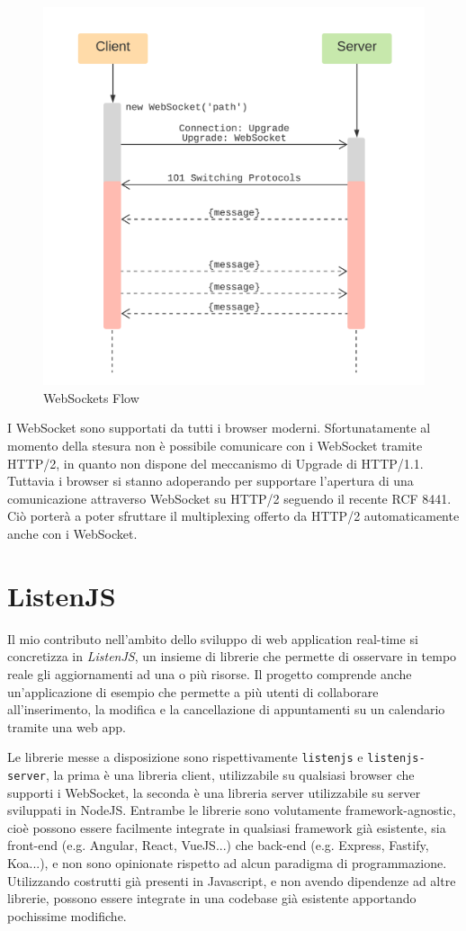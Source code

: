 \documentclass[12pt,a4paper,openright,twoside]{report}
\begin{document}
\begin{figure}[!htbp]
\centering
\includegraphics[width=.5\textwidth]{assets/websockets.png}
\caption{WebSockets Flow}
\label{fig:websockets}
\end{figure}
I WebSocket sono supportati da tutti i browser moderni. 
Sfortunatamente al momento della stesura non è possibile comunicare con i WebSocket tramite HTTP/2, in quanto non dispone del meccanismo di Upgrade di HTTP/1.1. Tuttavia i browser si stanno adoperando per supportare l'apertura di una comunicazione attraverso WebSocket su HTTP/2 seguendo il recente RCF 8441\cite{websockets_http2_rfc}. Ciò porterà a poter sfruttare il multiplexing offerto da HTTP/2 automaticamente anche con i WebSocket.
\chapter{ListenJS}
Il mio contributo nell'ambito dello sviluppo di web application real-time si concretizza in \textit{ListenJS}, un insieme di librerie che permette di osservare in tempo reale gli aggiornamenti ad una o più risorse.
Il progetto comprende anche un'applicazione di esempio che permette a più utenti di collaborare all'inserimento, la modifica e la cancellazione di appuntamenti su un calendario tramite una web app.

\bigskip

Le librerie messe a disposizione sono rispettivamente \lstinline{listenjs} e \lstinline{listenjs-server}, la prima è una libreria client, utilizzabile su qualsiasi browser che supporti i WebSocket, la seconda è una libreria server utilizzabile su server sviluppati in NodeJS.
Entrambe le librerie sono volutamente framework-agnostic, cioè possono essere facilmente integrate in qualsiasi framework già esistente, sia front-end (e.g. Angular, React, VueJS...) che back-end (e.g. Express, Fastify, Koa...), e non sono opinionate rispetto ad alcun paradigma di programmazione. Utilizzando costrutti già presenti in Javascript, e non avendo dipendenze ad altre librerie, possono essere integrate in una codebase già esistente apportando pochissime modifiche.
\end{document}
